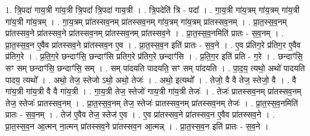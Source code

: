 \documentclass[17pt]{extarticle}
\begin{document}
1. त्रि॒पदा॑ गाय॒त्री गा॑य॒त्री त्रि॒पदा᳚ त्रि॒पदा॑ गाय॒त्री । . त्रि॒पदेति॑ त्रि - पदा᳚ । . गा॒य॒त्री गा॑य॒त्रम् गा॑य॒त्रम् गा॑य॒त्री गा॑य॒त्री गा॑य॒त्रम् । . गा॒य॒त्रम् प्रा॑तस्सव॒नम् प्रा॑तस्सव॒नम् गा॑य॒त्रम् गा॑य॒त्रम् प्रा॑तस्सव॒नम् । . प्रा॒त॒स्स॒व॒नम् प्रा॑तस्सव॒ने प्रा॑तस्सव॒ने प्रा॑तस्सव॒नम् प्रा॑तस्सव॒नम् प्रा॑तस्सव॒ने । . प्रा॒त॒स्स॒व॒नमिति॑ प्रातः - स॒व॒नम् । . प्रा॒त॒स्स॒व॒न ए॒वैव प्रा॑तस्सव॒ने प्रा॑तस्सव॒न ए॒व । . प्रा॒त॒स्स॒व॒न इति॑ प्रातः - स॒व॒ने । . ए॒व प्र॑तिग॒रे प्र॑तिग॒र ए॒वैव प्र॑तिग॒रे । . प्र॒ति॒ग॒रे छन्दाꣳ॑सि॒ छन्दाꣳ॑सि प्रतिग॒रे प्र॑तिग॒रे छन्दाꣳ॑सि । . प्र॒ति॒ग॒र इति॑ प्रति - ग॒रे । . छन्दाꣳ॑सि॒ सꣳ सम् छन्दाꣳ॑सि॒ छन्दाꣳ॑सि॒ सम् । . सम् पा॑दयति पादयति॒ सꣳ सम् पा॑दयति । . पा॒द॒य॒ त्यथो॒ अथो॑ पादयति पादय॒ त्यथो᳚ । . अथो॒ तेज॒ स्तेजो ऽथो॒ अथो॒ तेजः॑ । . अथो॒ इत्यथो᳚ । . तेजो॒ वै वै तेज॒ स्तेजो॒ वै । . वै गा॑य॒त्री गा॑य॒त्री वै वै गा॑य॒त्री । . गा॒य॒त्री तेज॒ स्तेजो॑ गाय॒त्री गा॑य॒त्री तेजः॑ । . तेजः॑ प्रातस्सव॒नम् प्रा॑तस्सव॒नम् तेज॒ स्तेजः॑ प्रातस्सव॒नम् । . प्रा॒त॒स्स॒व॒नम् तेज॒ स्तेजः॑ प्रातस्सव॒नम् प्रा॑तस्सव॒नम् तेजः॑ । . प्रा॒त॒स्स॒व॒नमिति॑ प्रातः - स॒व॒नम् । . तेज॑ ए॒वैव तेज॒ स्तेज॑ ए॒व । . ए॒व प्रा॑तस्सव॒ने प्रा॑तस्सव॒न ए॒वैव प्रा॑तस्सव॒ने । . प्रा॒त॒स्स॒व॒न आ॒त्मन् ना॒त्मन् प्रा॑तस्सव॒ने प्रा॑तस्सव॒न आ॒त्मन्न् । . प्रा॒त॒स्स॒व॒न इति॑ प्रातः - स॒व॒ने । \newline
\end{document}

